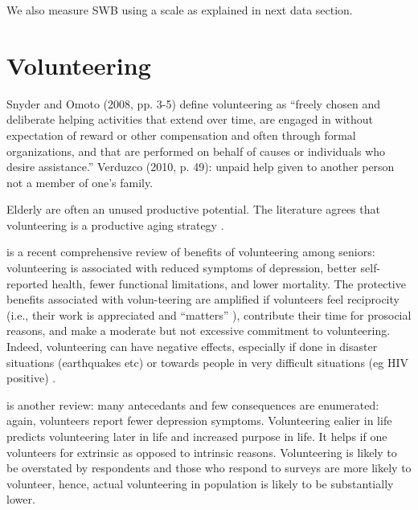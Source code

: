 \documentclass[10pt, letterpaper]{article}
\begin{document}
\begin{spacing}{1.4}
We also measure SWB using a scale as explained in next data section.

\section{Volunteering}


Snyder and Omoto (2008, pp. 3-5) %
 define volunteering as
 ``freely chosen and deliberate helping activities that
extend over time, are engaged in without expectation of reward or other
compensation
and often through formal organizations, and that are performed on behalf of
causes or
individuals who desire assistance.'' Verduzco (2010, p. 49): unpaid help given
to another person not a member of one's family. 

Elderly are often an unused productive potential.
The literature agrees that volunteering is a productive aging strategy
\citep[e.g.,][]{wilson12B,hank09}. 

\citet{anderson14} is a recent comprehensive review of benefits of
volunteering among seniors: volunteering is associated with reduced symptoms of
depression, better self-reported health, fewer functional limitations, and lower
mortality. The protective benefits associated with volun-teering are amplified if
volunteers feel reciprocity (i.e., their work is appreciated and ``matters'' ), contribute their
time for prosocial reasons, and make a moderate but not excessive commitment to
volunteering. Indeed, volunteering can have negative effects, especially if done
in disaster situations (earthquakes etc) or towards people in very difficult
situations (eg HIV positive) \citep{wilson12B}.

\citet{wilson12B} is another review: many antecedants and few consequences are
enumerated: again, volunteers report fewer depression symptoms. Volunteering
ealier in life predicts volunteering later in life and increased purpose in
life. It helps if one volunteers for extrinsic as opposed to intrinsic reasons. 
Volunteering is likely to be overstated by respondents and those who
respond to surveys are more likely to volunteer, hence, actual volunteering in
population is likely to be substantially lower. %


\end{spacing}
\end{document}
